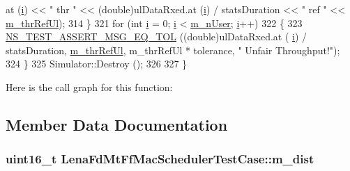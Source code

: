 \begin{DoxyCode}
      at (\hyperlink{bernuolliDistribution_8m_a6f6ccfcf58b31cb6412107d9d5281426}{i}) << \textcolor{stringliteral}{"  thr "} << (double)ulDataRxed.at (\hyperlink{bernuolliDistribution_8m_a6f6ccfcf58b31cb6412107d9d5281426}{i}) / statsDuration << \textcolor{stringliteral}{" ref "} << 
      \hyperlink{classLenaFdMtFfMacSchedulerTestCase_ac477368e603c067d75d99c896af8d49d}{m\_thrRefUl});
314     \}
321   \textcolor{keywordflow}{for} (\textcolor{keywordtype}{int} \hyperlink{bernuolliDistribution_8m_a6f6ccfcf58b31cb6412107d9d5281426}{i} = 0; \hyperlink{bernuolliDistribution_8m_a6f6ccfcf58b31cb6412107d9d5281426}{i} < \hyperlink{classLenaFdMtFfMacSchedulerTestCase_ad37e35252bb964ef3416fc10774ed9d1}{m\_nUser}; \hyperlink{bernuolliDistribution_8m_a6f6ccfcf58b31cb6412107d9d5281426}{i}++)
322     \{
323       \hyperlink{group__testing_ga9e7861b56b4e70db3b56044cb7a28e41}{NS\_TEST\_ASSERT\_MSG\_EQ\_TOL} ((\textcolor{keywordtype}{double})ulDataRxed.at (
      \hyperlink{bernuolliDistribution_8m_a6f6ccfcf58b31cb6412107d9d5281426}{i}) / statsDuration, \hyperlink{classLenaFdMtFfMacSchedulerTestCase_ac477368e603c067d75d99c896af8d49d}{m\_thrRefUl}, m\_thrRefUl * tolerance, \textcolor{stringliteral}{" Unfair Throughput!"});
324     \}
325   Simulator::Destroy ();
326 
327 \}
\end{DoxyCode}


Here is the call graph for this function\+:




\subsection{Member Data Documentation}
\subsubsection[{\texorpdfstring{m\+\_\+dist}{m_dist}}]{\setlength{\rightskip}{0pt plus 5cm}uint16\+\_\+t Lena\+Fd\+Mt\+Ff\+Mac\+Scheduler\+Test\+Case\+::m\+\_\+dist\hspace{0.3cm}{\ttfamily [private]}}\hypertarget{classLenaFdMtFfMacSchedulerTestCase_a10d998134a542e3dc4a5d22f80a786b2}{}\label{classLenaFdMtFfMacSchedulerTestCase_a10d998134a542e3dc4a5d22f80a786b2}
